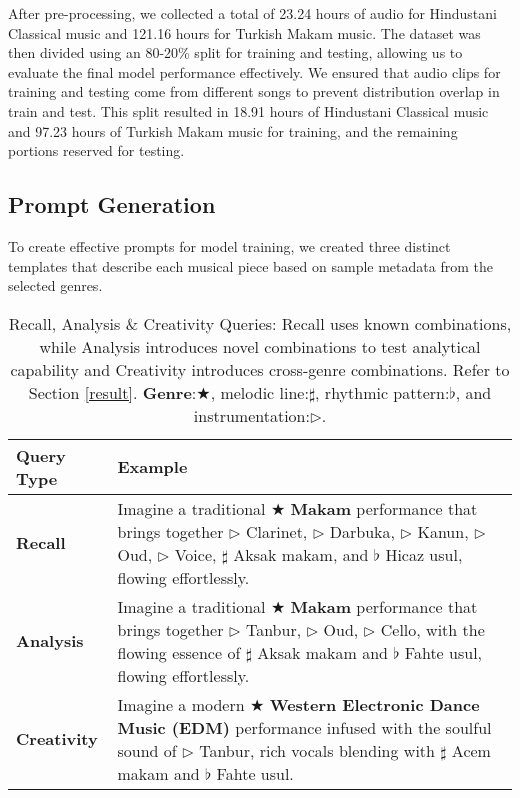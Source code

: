 After pre-processing, we collected a total of 23.24 hours of audio for Hindustani Classical music and 121.16 hours for Turkish Makam music. The dataset was then divided using an 80-20\% split for training and testing, allowing us to evaluate the final model performance effectively. We ensured that audio clips for training and testing come from different songs to prevent distribution overlap in train and test. This split resulted in 18.91 hours of Hindustani Classical music and 97.23 hours of Turkish Makam music for training, and the remaining portions reserved for testing. 


\subsection{Prompt Generation}


To create effective prompts for model training, we created three distinct templates that describe each musical piece based on sample metadata from the selected genres. 

\begin{table}[!t]
\centering
\small
\setlength{\tabcolsep}{6pt} %
\begin{tabularx}{\columnwidth}{lX} %
\toprule
\textbf{Query Type} & \textbf{Example} \\
\midrule
\textbf{Recall} & Imagine a traditional $\bigstar$ \textbf{Makam} performance that brings together $\triangleright$ Clarinet, $\triangleright$ Darbuka, $\triangleright$ Kanun, $\triangleright$ Oud, $\triangleright$ Voice, $\sharp$ Aksak makam, and $\flat$ Hicaz usul, flowing effortlessly. \\ \midrule
\textbf{Analysis} & Imagine a traditional $\bigstar$ \textbf{Makam} performance that brings together $\triangleright$ Tanbur, $\triangleright$ Oud, $\triangleright$ Cello, with the flowing essence of $\sharp$ Aksak makam and $\flat$ Fahte usul, flowing effortlessly. \\ \midrule
\textbf{Creativity} & Imagine a modern $\bigstar$ \textbf{Western Electronic Dance Music (EDM)} performance infused with the soulful sound of $\triangleright$ Tanbur, rich vocals blending with $\sharp$ Acem makam and $\flat$ Fahte usul. \\
\bottomrule
\end{tabularx}
\caption{Recall, Analysis \& Creativity Queries: Recall uses known combinations, while Analysis introduces novel combinations to test analytical capability and Creativity introduces cross-genre combinations. Refer to Section \ref{result}. \textbf{Genre}:$\bigstar$, melodic line:$\sharp$, rhythmic pattern:$\flat$, and instrumentation:$\triangleright$.}
\label{tab:queries}
\end{table}


